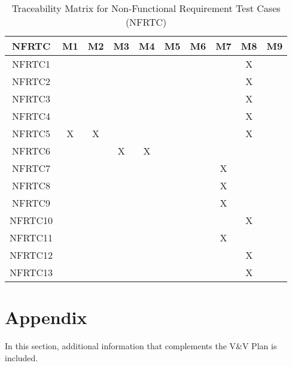 \documentclass[12pt, titlepage]{article}
\begin{document}
\begin{table}[h!]
  \centering
  \caption{Traceability Matrix for Non-Functional Requirement Test Cases (NFRTC)}
  \begin{tabular}{|c|c|c|c|c|c|c|c|c|c|}
    \hline
    \textbf{NFRTC} & \textbf{M1} & \textbf{M2} & \textbf{M3} & \textbf{M4} & \textbf{M5} & \textbf{M6} & \textbf{M7} & \textbf{M8} & \textbf{M9} \\
    \hline
    NFRTC1  &   &   &   &   &   &   &   & X &   \\ %
    \hline
    NFRTC2  &   &   &   &   &   &   &   & X &   \\ %
    \hline
    NFRTC3  &   &   &   &   &   &   &   & X &   \\ %
    \hline
    NFRTC4  &   &   &   &   &   &   &   & X &   \\ %
    \hline
    NFRTC5  & X & X &   &   &   &   &   & X &   \\ %
    \hline
    NFRTC6  &   &   & X & X &   &   &   &   &   \\ %
    \hline
    NFRTC7  &   &   &   &   &   &   & X &   &   \\ %
    \hline
    NFRTC8  &   &   &   &   &   &   & X &   &   \\ %
    \hline
    NFRTC9  &   &   &   &   &   &   & X &   &   \\ %
    \hline
    NFRTC10 &   &   &   &   &   &   &   & X &   \\ %
    \hline
    NFRTC11 &   &   &   &   &   &   & X &   &   \\ %
    \hline
    NFRTC12 &   &   &   &   &   &   &   & X &   \\ %
    \hline
    NFRTC13 &   &   &   &   &   &   &   & X &   \\ %
    \hline
  \end{tabular}
\end{table}


\pagebreak
\newpage

\section{Appendix}
In this section, additional information that complements the V\&V Plan is included.
\end{document}
